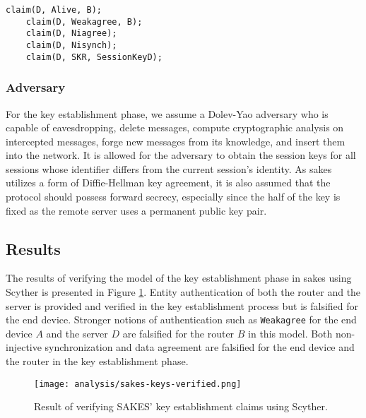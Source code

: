 \begin{lstlisting}[caption={Security claims for role D during key establishment in SAKES.}, label={lst:claims-d-sakes-key}]
	claim(D, Alive, B);
	claim(D, Weakagree, B);
	claim(D, Niagree);
	claim(D, Nisynch);
	claim(D, SKR, SessionKeyD);
\end{lstlisting}

\subsubsection{Adversary}

For the key establishment phase, we assume a Dolev-Yao adversary who is capable of eavesdropping, delete messages, compute cryptographic analysis on intercepted messages, forge new messages from its knowledge, and insert them into the network. It is allowed for the adversary to obtain the session keys for all sessions whose identifier differs from the current session's identity. As \gls{sakes} utilizes a form of Diffie-Hellman key agreement, it is also assumed that the protocol should possess forward secrecy, especially since the half of the key is fixed as the remote server uses a permanent public key pair.

\subsection{Results}
\label{subsec:sakes-keys-results}

The results of verifying the model of the key establishment phase in \gls{sakes} using Scyther is presented in Figure \ref{fig:sakes-verified-keys}. Entity authentication of both the router and the server is provided and verified in the key establishment process but is falsified for the end device. Stronger notions of authentication such as \texttt{Weakagree} for the end device $A$ and the server $D$ are falsified for the router $B$ in this model. Both non-injective synchronization and data agreement are falsified for the end device and the router in the key establishment phase.

\begin{figure}[h]
	\centering
	\texttt{[image: analysis/sakes-keys-verified.png]}
	\caption{Result of verifying SAKES' key establishment claims using Scyther.}
	\label{fig:sakes-verified-keys}
\end{figure}

